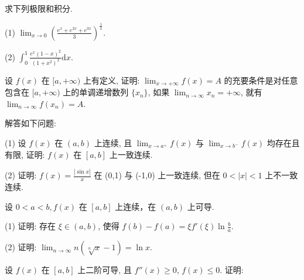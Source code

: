 \par{}
求下列极限和积分.\par
(1) $\lim_{x\to 0}\left(\frac{e^x + e^{2x} + e^{3x}}{3}\right)^{\frac{1}{x}}.$\par
(2) $\int_0^1\frac{e^x(1 - x)^2}{(1 + x^2)^2}\mathrm{d}x.$\par
\par{}
设 $f(x)$ 在 $[a, +\infty)$ 上有定义, 证明: $\lim_{x \to +\infty} f(x) = A$ 的充要条件是对任意包含在 $[a, +\infty)$ 上的单调递增数列 $\{x_n\}$, 如果 $\lim_{n \to \infty} x_n = +\infty$, 就有 $\lim_{n \to \infty} f(x_n) = A$.\par
\par{}
解答如下问题:\par
(1) 设 $f(x)$ 在 $(a, b)$ 上连续, 且 $\lim_{x \to a^{+}} f(x)$ 与 $\lim_{x \to b^{-}} f(x)$ 均存在且有限, 证明: $f(x)$ 在 $[a, b]$ 上一致连续.\par
(2) 证明: $f(x) = \frac{|\sin x|}{x}$ 在 (0,1) 与 (-1,0) 上一致连续, 但在 $0 < |x| < 1$ 上不一致连续.\par
\par{}
设 $0 < a < b, f(x)$ 在 $[a, b]$ 上连续，在 $(a, b)$ 上可导.\par
(1) 证明: 存在 $\xi \in (a, b)$, 使得 $f(b) - f(a) = \xi f'(\xi) \ln \frac{b}{a}$.\par
(2) 证明: $\lim_{n\to \infty}n(\sqrt[n]{x} -1) = \ln x.$\par
\par{}
\par{}
设 $f(x)$ 在 $[a, b]$ 上二阶可导, 且 $f''(x) \geq 0$, $f(x) \leq 0$. 证明:\par

